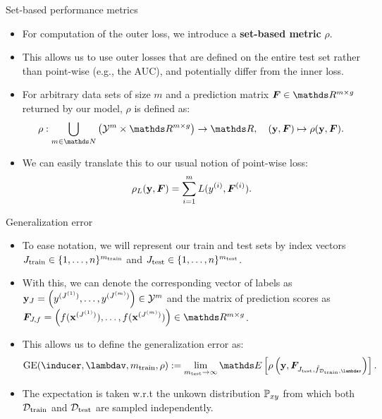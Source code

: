 \documentclass[11pt,compress,t,notes=noshow, xcolor=table]{beamer}
\begin{document}

\begin{vbframe}{Set-based performance metrics}

\begin{itemize}
  \item For computation of the outer loss, we introduce a 
  \textbf{set-based metric} $\rho$.
  \item This allows us to use outer losses that are defined on the entire test 
  set rather than point-wise (e.g., the AUC), and potentially differ from the 
  inner loss.
  \item For arbitrary data sets of size $m$ and a prediction matrix 
  $\bm{F} \in \R^{m \times g}$ returned by our model, $\rho$ is defined as:
  $$\rho: \bigcup_{m \in \N} \left( \Yspace^m \times \R^{m \times g} \right) 
  \rightarrow \R, \quad (\yv, \bm{F}) \mapsto \rho(\yv, \bm{F}).$$
  \item We can easily translate this to our usual notion of point-wise loss:
  $$\rho_L(\mathbf{y}, \bm{F}) = \sum_{i=1}^m L(y^{(i)}, \bm{F}^{(i)}).$$
\end{itemize}

\end{vbframe}


\begin{vbframe}{Generalization error}

\begin{itemize}
  \item To ease notation, we will represent our train and test sets by index 
  vectors $J_\mathrm{train} \in \{1, \ldots, n\}^{m_\mathrm{train}}$ and $J_\mathrm{test} 
  \in \{1, \ldots, n\}^{m_\mathrm{test}}$.
  \item With this, we can denote the corresponding vector of labels as
  $\mathbf{y}_J = \left(y^{(J^{(1)})},\dots, y^{(J^{(m)})} \right) \in \mathcal{Y}^m$ and 
  the matrix of prediction scores as
  $\bm{F}_{J,f} = \left( f(\xv^{(J^{(1)})}), \dots, f(\xv^{(J^{(m)})}) \right)
  \in \R^{m\times g}$.
  \item This allows us to define the generalization error as:
  $$\mathrm{GE}(\inducer, \lambdav, m_{\mathrm{train}}, \rho) := 
  \lim_{m_{\mathrm{test}} \rightarrow \infty} \E \left[ \rho \left(
  \yv, \bm{F}_{J_{\mathrm{test}},\fh_{\mathcal{D}_{\mathrm{train}}, \lambdav}} 
  \right)\right].$$
  \item The expectation is taken w.r.t the unkown distribution $\mathbb{P}_{xy}$ from which 
  both $\mathcal{D}_{\text{train}}$ and $\mathcal{D}_{\text{test}}$ are sampled independently.
\end{itemize}

\end{vbframe}

\endlecture
\end{document}
